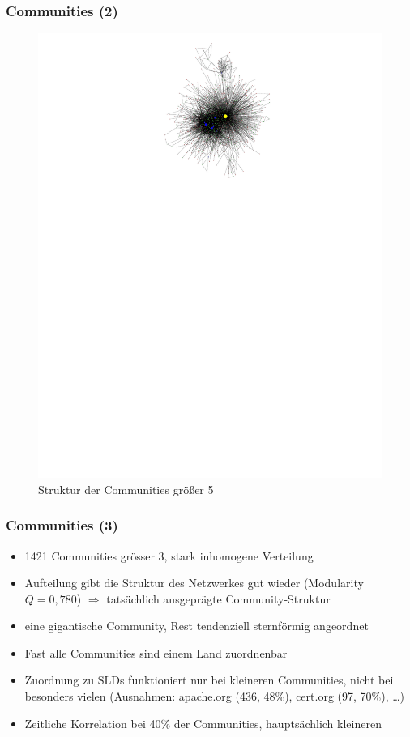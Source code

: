 \documentclass[10pt]{beamer}
\begin{document}
\begin{frame}
  \frametitle{Communities (2)}
  \begin{figure}
    \centering
  \includegraphics[scale=1.1,angle=90]{../ausarbeitung/images/metagraph-copra1-minsize5.pdf}
   \caption{Struktur der Communities gr\"o{\ss}er 5} 
  \end{figure}
  
\end{frame}

\begin{frame}
  \frametitle{Communities (3)}
  \begin{itemize}
  \item 1421 Communities gr\"osser 3, stark inhomogene Verteilung
  \item Aufteilung gibt die Struktur des Netzwerkes gut wieder
    (Modularity $Q=0,780$) $\Rightarrow$ tats\"achlich ausgepr\"agte
    Community-Struktur
  \item eine gigantische Community, Rest tendenziell sternf\"ormig
    angeordnet
  \item Fast alle Communities sind einem Land zuordnenbar
  \item Zuordnung zu SLDs funktioniert nur bei kleineren Communities,
    nicht bei besonders vielen (Ausnahmen: apache.org (436, 48\%),
    cert.org (97, 70\%), \dots)
  \item Zeitliche Korrelation bei 40\% der Communities,
    haupts\"achlich kleineren
  \end{itemize}
  
\end{frame}
\end{document}

